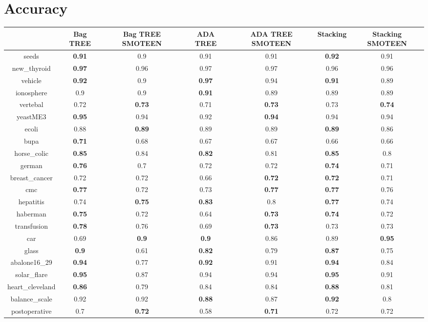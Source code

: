 \documentclass{article}%
\begin{document}
%
\normalsize%
\section*{Accuracy}%
\begin{tabular}{c|cccccc}%
&Bag TREE&Bag TREE SMOTEEN&ADA TREE&ADA TREE SMOTEEN&Stacking&Stacking SMOTEEN\\%
\hline%
seeds&\textbf{0.91}&0.9&0.91&0.91&\textbf{0.92}&0.91\\%
new\_thyroid&\textbf{0.97}&0.96&0.97&0.97&0.96&0.96\\%
vehicle&\textbf{0.92}&0.9&\textbf{0.97}&0.94&\textbf{0.91}&0.89\\%
ionosphere&0.9&0.9&\textbf{0.91}&0.89&0.89&0.89\\%
vertebal&0.72&\textbf{0.73}&0.71&\textbf{0.73}&0.73&\textbf{0.74}\\%
yeastME3&\textbf{0.95}&0.94&0.92&\textbf{0.94}&0.94&0.94\\%
ecoli&0.88&\textbf{0.89}&0.89&0.89&\textbf{0.89}&0.86\\%
bupa&\textbf{0.71}&0.68&0.67&0.67&0.66&0.66\\%
horse\_colic&\textbf{0.85}&0.84&\textbf{0.82}&0.81&\textbf{0.85}&0.8\\%
german&\textbf{0.76}&0.7&0.72&0.72&\textbf{0.74}&0.71\\%
breast\_cancer&0.72&0.72&0.66&\textbf{0.72}&\textbf{0.72}&0.71\\%
cmc&\textbf{0.77}&0.72&0.73&\textbf{0.77}&\textbf{0.77}&0.76\\%
hepatitis&0.74&\textbf{0.75}&\textbf{0.83}&0.8&\textbf{0.77}&0.74\\%
haberman&\textbf{0.75}&0.72&0.64&\textbf{0.73}&\textbf{0.74}&0.72\\%
transfusion&\textbf{0.78}&0.76&0.69&\textbf{0.73}&0.73&0.73\\%
car&0.69&\textbf{0.9}&\textbf{0.9}&0.86&0.89&\textbf{0.95}\\%
glass&\textbf{0.9}&0.61&\textbf{0.82}&0.79&\textbf{0.87}&0.75\\%
abalone16\_29&\textbf{0.94}&0.77&\textbf{0.92}&0.91&\textbf{0.94}&0.84\\%
solar\_flare&\textbf{0.95}&0.87&0.94&0.94&\textbf{0.95}&0.91\\%
heart\_cleveland&\textbf{0.86}&0.79&0.84&0.84&\textbf{0.88}&0.81\\%
balance\_scale&0.92&0.92&\textbf{0.88}&0.87&\textbf{0.92}&0.8\\%
postoperative&0.7&\textbf{0.72}&0.58&\textbf{0.71}&0.72&0.72\\%
\end{tabular}
\end{document}
